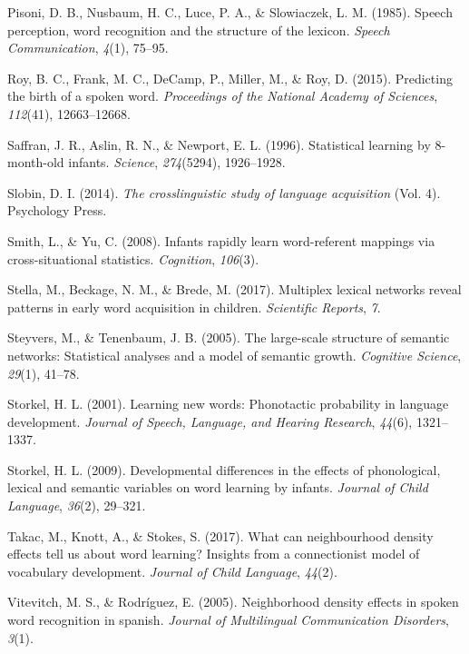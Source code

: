 \documentclass[english,floatsintext,man]{apa6}
\theoremstyle{definition}
\theoremstyle{definition}
\theoremstyle{definition}
\theoremstyle{remark}
\begin{document}
\hypertarget{ref-pisoni1985}{}
Pisoni, D. B., Nusbaum, H. C., Luce, P. A., \& Slowiaczek, L. M. (1985).
Speech perception, word recognition and the structure of the lexicon.
\emph{Speech Communication}, \emph{4}(1), 75--95.

\hypertarget{ref-roy2015}{}
Roy, B. C., Frank, M. C., DeCamp, P., Miller, M., \& Roy, D. (2015).
Predicting the birth of a spoken word. \emph{Proceedings of the National
Academy of Sciences}, \emph{112}(41), 12663--12668.

\hypertarget{ref-saffran1996}{}
Saffran, J. R., Aslin, R. N., \& Newport, E. L. (1996). Statistical
learning by 8-month-old infants. \emph{Science}, \emph{274}(5294),
1926--1928.

\hypertarget{ref-slobin2014}{}
Slobin, D. I. (2014). \emph{The crosslinguistic study of language
acquisition} (Vol. 4). Psychology Press.

\hypertarget{ref-smith2008}{}
Smith, L., \& Yu, C. (2008). Infants rapidly learn word-referent
mappings via cross-situational statistics. \emph{Cognition},
\emph{106}(3).

\hypertarget{ref-stella2017}{}
Stella, M., Beckage, N. M., \& Brede, M. (2017). Multiplex lexical
networks reveal patterns in early word acquisition in children.
\emph{Scientific Reports}, \emph{7}.

\hypertarget{ref-steyvers2005}{}
Steyvers, M., \& Tenenbaum, J. B. (2005). The large-scale structure of
semantic networks: Statistical analyses and a model of semantic growth.
\emph{Cognitive Science}, \emph{29}(1), 41--78.

\hypertarget{ref-storkel2001}{}
Storkel, H. L. (2001). Learning new words: Phonotactic probability in
language development. \emph{Journal of Speech, Language, and Hearing
Research}, \emph{44}(6), 1321--1337.

\hypertarget{ref-storkel2009}{}
Storkel, H. L. (2009). Developmental differences in the effects of
phonological, lexical and semantic variables on word learning by
infants. \emph{Journal of Child Language}, \emph{36}(2), 29--321.

\hypertarget{ref-takac2017}{}
Takac, M., Knott, A., \& Stokes, S. (2017). What can neighbourhood
density effects tell us about word learning? Insights from a
connectionist model of vocabulary development. \emph{Journal of Child
Language}, \emph{44}(2).

\hypertarget{ref-vitevitch2005}{}
Vitevitch, M. S., \& Rodríguez, E. (2005). Neighborhood density effects
in spoken word recognition in spanish. \emph{Journal of Multilingual
Communication Disorders}, \emph{3}(1).
\end{document}

